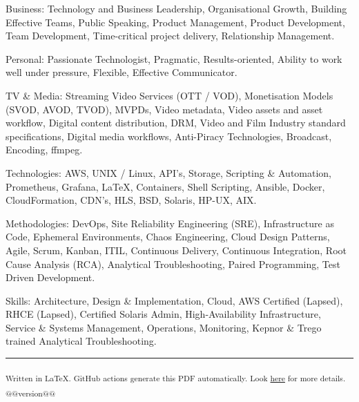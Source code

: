 \documentclass[10pt,a4paper]{article}
\makeatletter
\newenvironment{indentsection}[1]%
\newcommand{\headerrow}[2]
{\begin{tabular*}{\linewidth}{l@{\extracolsep{\fill}}r}
	#1 &
	#2 \\
\end{tabular*}}
\makeatother
\begin{document}
\begin{indentsection}{\parindent}
\begin{description*}
		\item[Business:]
		Technology and Business Leadership, Organisational Growth, Building Effective Teams, Public Speaking, Product Management, Product Development, Team Development, Time-critical project delivery, Relationship Management.
    \item[Personal:]
		Passionate Technologist, Pragmatic, Results-oriented, Ability to work well under pressure, Flexible, Effective Communicator.
    \item[TV \& Media:]
    Streaming Video Services (OTT / VOD), Monetisation Models (SVOD, AVOD, TVOD), MVPDs, Video metadata, Video assets and asset workflow, Digital content distribution, DRM, Video and Film Industry standard specifications, Digital media workflows, Anti-Piracy Technologies, Broadcast, Encoding, ffmpeg.
    \item[Technologies:]
    AWS, UNIX / Linux, API's, Storage, Scripting \& Automation, Prometheus, Grafana, \LaTeX, Containers, Shell Scripting, Ansible, Docker, CloudFormation, CDN's, HLS, BSD, Solaris, HP-UX, AIX.
    \item[Methodologies:]
    DevOps, Site Reliability Engineering (SRE), Infrastructure as Code, Ephemeral Environments, Chaos Engineering, Cloud Design Patterns, Agile, Scrum, Kanban, ITIL, Continuous Delivery, Continuous Integration, Root Cause Analysis (RCA), Analytical Troubleshooting, Paired Programming, Test Driven Development.
    \item[Skills:]
    Architecture, Design \& Implementation, Cloud, AWS Certified (Lapsed), RHCE (Lapsed), Certified Solaris Admin, High-Availability Infrastructure, Service \& Systems Management, Operations, Monitoring, Kepnor \& Trego trained Analytical Troubleshooting.

\end{description*}
\end{indentsection}

\hrule
\vspace{-0.4em}

\begin{description*}
  	\item
  \headerrow
    {{\textsubscript{Written in \LaTeX. GitHub actions generate this PDF automatically. Look \href{https://github.com/robert-will-brown/cv}{here} for more details.}}}
    {{\textsubscript{@@version@@}}}

\end{description*}
\end{document}

